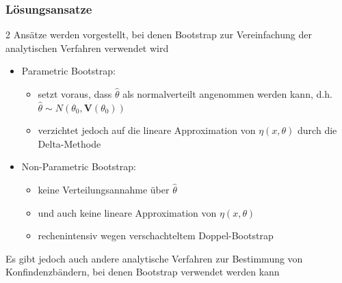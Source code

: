 \documentclass[aspectratio=1610, 9pt]{beamer}
\begin{document}
\begin{frame}
  \frametitle{Lösungsansatze}
  2 Ansätze werden vorgestellt, bei denen Bootstrap zur Vereinfachung der analytischen Verfahren verwendet wird
  \begin{itemize}
    \item Parametric Bootstrap:
    \begin{itemize}
      \item setzt voraus, dass $\hat\theta$ als normalverteilt angenommen werden kann, d.h. $\hat\theta \sim N(\theta_0, \mathbf{V}(\theta_0))$
      \item verzichtet jedoch auf die lineare Approximation von $\eta(x,\theta)$ durch die Delta-Methode
    \end{itemize}
    \item Non-Parametric Bootstrap:
    \begin{itemize}
      \item keine Verteilungsannahme über $\hat\theta$
      \item und auch keine lineare Approximation von $\eta(x,\theta)$
      \item rechenintensiv wegen verschachteltem Doppel-Bootstrap 
    \end{itemize}
  \end{itemize}
  Es gibt jedoch auch andere analytische Verfahren zur Bestimmung von Konfindenzbändern, bei denen Bootstrap verwendet werden kann
\end{frame}
\end{document}
